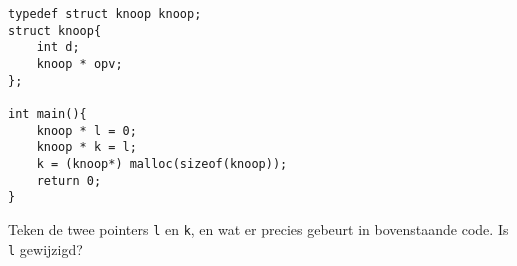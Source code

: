 \beginoef
\begin{footnotesize}
\begin{verbatim}
typedef struct knoop knoop;
struct knoop{
    int d;
    knoop * opv;   
};

int main(){
    knoop * l = 0;
    knoop * k = l;
    k = (knoop*) malloc(sizeof(knoop));   
    return 0;
}
\end{verbatim}
\end{footnotesize}

Teken de twee pointers \verb}l} en \verb}k}, en wat er precies gebeurt in bovenstaande code. 
Is \verb}l} gewijzigd? 
%

\endoef
